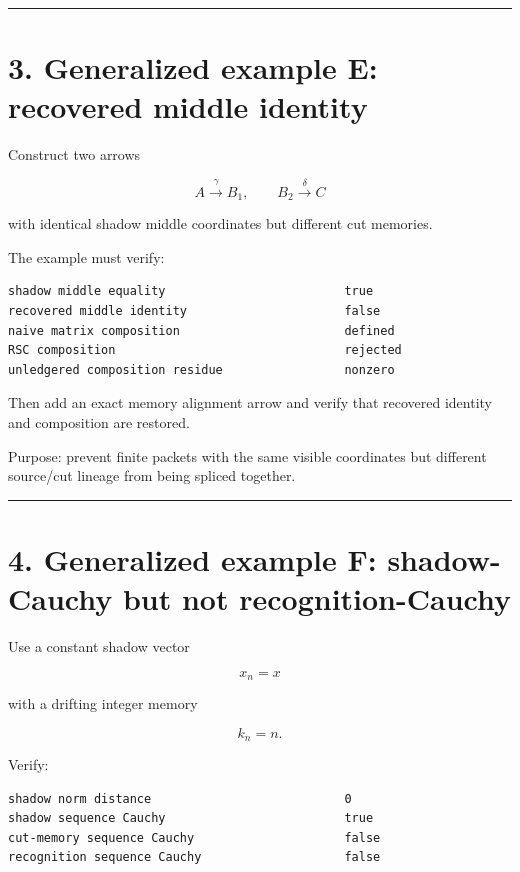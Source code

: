 \begin{center}\rule{0.5\linewidth}{0.5pt}\end{center}

\hypertarget{generalized-example-e-recovered-middle-identity}{%
\section{3. Generalized example E: recovered middle identity}\label{generalized-example-e-recovered-middle-identity}}

Construct two arrows

\[
A\xrightarrow{\gamma}B_1,
\qquad
B_2\xrightarrow{\delta}C
\]

with identical shadow middle coordinates but different cut memories.

The example must verify:

\begin{verbatim}
shadow middle equality                         true
recovered middle identity                      false
naive matrix composition                       defined
RSC composition                                rejected
unledgered composition residue                 nonzero
\end{verbatim}

Then add an exact memory alignment arrow and verify that recovered identity and
composition are restored.

Purpose: prevent finite packets with the same visible coordinates but different
source/cut lineage from being spliced together.

\begin{center}\rule{0.5\linewidth}{0.5pt}\end{center}

\hypertarget{generalized-example-f-shadow-cauchy-but-not-recognition-cauchy}{%
\section{4. Generalized example F: shadow-Cauchy but not recognition-Cauchy}\label{generalized-example-f-shadow-cauchy-but-not-recognition-cauchy}}

Use a constant shadow vector

\[
x_n=x
\]

with a drifting integer memory

\[
k_n=n.
\]

Verify:

\begin{verbatim}
shadow norm distance                           0
shadow sequence Cauchy                         true
cut-memory sequence Cauchy                     false
recognition sequence Cauchy                    false
\end{verbatim}

